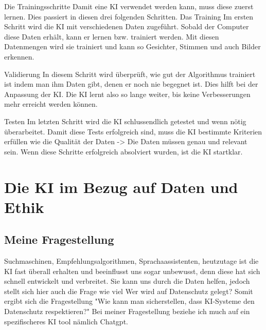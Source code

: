 \documentclass{report}
\begin{document}
Die Trainingsschritte
Damit eine KI verwendet werden kann, muss diese zuerst lernen. Dies passiert in diesen drei folgenden Schritten.
Das Training
Im ersten Schritt wird die KI mit verschiedenen Daten zugeführt. Sobald der Computer diese Daten erhält, kann er lernen bzw. trainiert werden. Mit diesen Datenmengen wird sie trainiert und kann so Gesichter, Stimmen und auch Bilder erkennen.

Validierung 
In diesem Schritt wird überprüft, wie gut der Algorithmus trainiert ist indem man ihm Daten gibt, denen er noch nie begegnet ist. Dies hilft bei der Anpassung der KI. 
Die KI lernt also so lange weiter, bis keine Verbesserungen mehr erreicht werden können. 

Testen 
Im letzten Schritt wird die KI schlussendlich getestet und wenn nötig überarbeitet.
Damit diese Tests erfolgreich sind, muss die KI bestimmte Kriterien erfüllen wie die Qualität der Daten -> Die Daten müssen genau und relevant sein.
Wenn diese Schritte erfolgreich absolviert wurden, ist die KI startklar. 

\chapter{Die KI im Bezug auf Daten und Ethik}
\section{Meine Fragestellung}
Suchmaschinen, Empfehlungsalgorithmen, Sprachaassistenten, heutzutage ist die KI fast überall erhalten und beeinflusst uns sogar unbewusst, denn diese hat sich schnell entwickelt und verbreitet. 
Sie kann uns durch die Daten helfen, jedoch stellt sich hier auch die Frage wie viel Wer wird auf Datenschutz gelegt? 
Somit ergibt sich die Fragestellung "Wie kann man sicherstellen, dass KI-Systeme den Datenschutz respektieren?"
Bei meiner Fragestellung beziehe ich much auf ein spezifischeres KI tool nämlich Chatgpt. 
\end{document}
